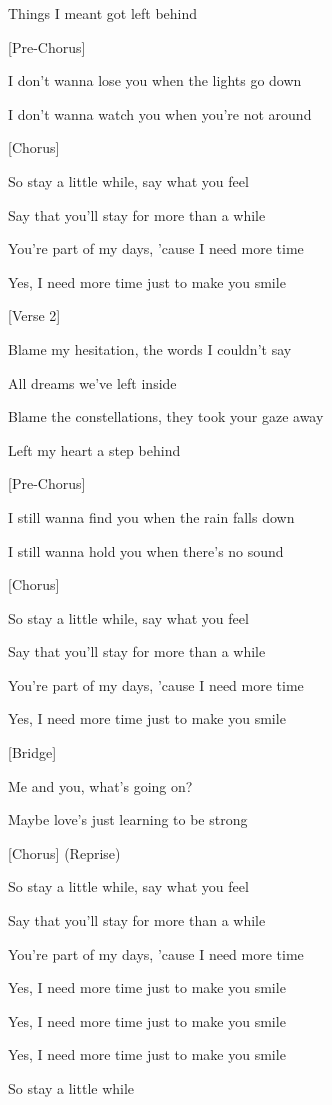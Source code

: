 \documentclass[
  letterpaper,
  DIV=11,
  numbers=noendperiod]{scrreprt}
\begin{document}
Things I meant got left behind

{[}Pre-Chorus{]}

I don't wanna lose you when the lights go down

I don't wanna watch you when you're not around

{[}Chorus{]}

So stay a little while, say what you feel

Say that you'll stay for more than a while

You're part of my days, 'cause I need more time

Yes, I need more time just to make you smile

{[}Verse 2{]}

Blame my hesitation, the words I couldn't say

All dreams we've left inside

Blame the constellations, they took your gaze away

Left my heart a step behind

{[}Pre-Chorus{]}

I still wanna find you when the rain falls down

I still wanna hold you when there's no sound

{[}Chorus{]}

So stay a little while, say what you feel

Say that you'll stay for more than a while

You're part of my days, 'cause I need more time

Yes, I need more time just to make you smile

{[}Bridge{]}

Me and you, what's going on?

Maybe love's just learning to be strong

{[}Chorus{]} (Reprise)

So stay a little while, say what you feel

Say that you'll stay for more than a while

You're part of my days, 'cause I need more time

Yes, I need more time just to make you smile

Yes, I need more time just to make you smile

Yes, I need more time just to make you smile

So stay a little while

\end{document}

